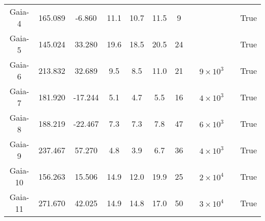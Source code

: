 \begin{table}
\begin{tabular}{cSSSSSScccc}
Gaia-4 & 165.089 & -6.860 & 11.1 & 10.7 & 11.5 & 9 & \citet{malhan:2018} & &  & True \\
Gaia-5 & 145.024 & 33.280 & 19.6 & 18.5 & 20.5 & 24 & \citet{malhan:2018} & &  & True \\
Gaia-6 & 213.832 & 32.689 & 9.5 & 8.5 & 11.0 & 21 & \citet{ibata:2023} & $9 \times 10^{3}$ &  & True \\
Gaia-7 & 181.920 & -17.244 & 5.1 & 4.7 & 5.5 & 16 & \citet{ibata:2023} & $4 \times 10^{3}$ &  & True \\
Gaia-8 & 188.219 & -22.467 & 7.3 & 7.3 & 7.8 & 47 & \citet{ibata:2023} & $6 \times 10^{3}$ &  & True \\
Gaia-9 & 237.467 & 57.270 & 4.8 & 3.9 & 6.7 & 36 & \citet{ibata:2023} & $4 \times 10^{3}$ &  & True \\
Gaia-10 & 156.263 & 15.506 & 14.9 & 12.0 & 19.9 & 25 & \citet{ibata:2023} & $2 \times 10^{4}$ &  & True \\
Gaia-11 & 271.670 & 42.025 & 14.9 & 14.8 & 17.0 & 50 & \citet{ibata:2023} & $3 \times 10^{4}$ &  & True \\
\hline \hline
\end{tabular}
\end{table}
